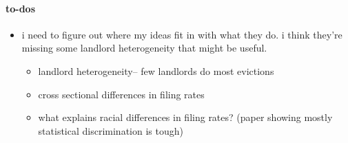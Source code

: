 \paragraph{to-dos}
\begin{itemize}
    \item i need to figure out where my ideas fit in with what they do. i think they're missing some landlord heterogeneity that might be useful.
    \begin{itemize}
        \item landlord heterogeneity-- few landlords do most evictions
        \item cross sectional differences in filing rates
        \item what explains racial differences in filing rates? (paper showing mostly statistical discrimination is tough)
    \end{itemize}
\end{itemize}